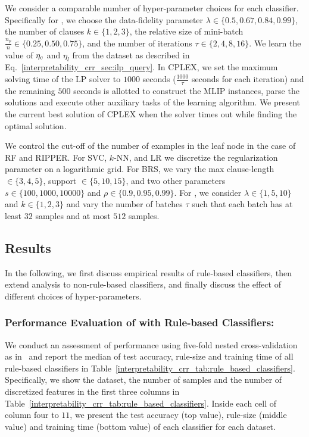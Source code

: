We consider a comparable number  of hyper-parameter choices  for each classifier. Specifically for {\crr}, we choose the data-fidelity parameter $ \lambda \in \{0.5, 0.67, 0.84, 0.99\} $, the number of clauses $ k \in \{1,2,3\} $, the relative size of mini-batch $ \frac{n_p}{n} \in \{0.25, 0.50, 0.75\} $, and the number of iterations $ \tau \in \{2,4,8,16\} $. We learn the value of $ \eta_c $ and $ \eta_{l} $ from the dataset as described in Eq.~\ref{interpretability_crr_sec:ilp_query}.  In CPLEX, we set the  maximum solving time of the LP solver to $ 1000 $  seconds ($ \frac{ 1000 }{\tau} $ seconds for each iteration) and the remaining $ 500 $ seconds is allotted to construct the MLIP instances, parse the solutions and execute  other auxiliary tasks of the learning algorithm. We present the current best solution of CPLEX when the solver times out while finding the optimal solution.  

We control the cut-off of the number of examples in the leaf node in the case of RF and RIPPER. For SVC, $ k $-NN, and LR we discretize the regularization parameter on a logarithmic grid. For BRS, we vary the max clause-length $ \in \{3,4,5\} $, support $ \in  \{5,10,15\} $, and two other parameters $ s \in \{100,1000,10000\} $ and $ \rho \in \{0.9,0.95,0.99\} $.  For  {\IMLI}, we consider  $ \lambda \in \{1,5,10\} $ and  $ k \in \{1,2,3\} $ and  vary the number of batches $ \tau $ such that each batch has at least $ 32 $ samples and at most $ 512 $ samples.  




	








\subsection{Results}
In the following, we first discuss empirical results of rule-based classifiers, then extend analysis to non-rule-based classifiers, and finally discuss the effect of different choices of hyper-parameters. 
\subsubsection*{Performance Evaluation of {\crr} with Rule-based Classifiers:}
We conduct an assessment of performance  using five-fold nested cross-validation as in~\cite{DGW2018}  and report the median of test accuracy, rule-size and training time of all rule-based classifiers in Table~\ref{interpretability_crr_tab:rule_based_classifiers}. 
Specifically, we show the dataset,  the number of samples and the number of discretized features in the first three columns in Table~\ref{interpretability_crr_tab:rule_based_classifiers}. Inside each cell of column   four to $    11 $,  we present the   test accuracy (top value), rule-size (middle value) and training time (bottom value) of each classifier for each dataset. 



